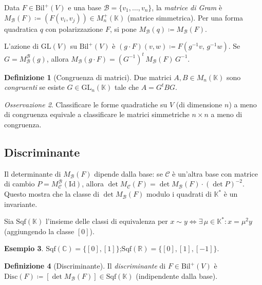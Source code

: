 \documentclass[11pt, a4paper]{book}
\theoremstyle{definition}
\newtheorem{definizione}{Definizione}[section]
\newtheorem{esempio}[definizione]{Esempio}
\theoremstyle{plain}
\theoremstyle{remark}
\newtheorem{osservazione}[definizione]{Osservazione}
\newcommand{\R}{\mathbb{R}}
\newcommand{\C}{\mathbb{C}}
\newcommand{\K}{\mathbb{K}}
\newcommand{\Id}{\mathrm{Id}}
\newcommand{\GL}{\mathrm{GL}}
\begin{document}
Data $F \in \mathrm{Bil}^+(V)$ e una base $\mathcal{B} = \{v_1,\ldots,v_n\}$, la \emph{matrice di Gram} è $M_\mathcal{B}(F) \coloneqq (F(v_i,v_j)) \in M_n^+(\K)$ (matrice simmetrica). Per una forma quadratica $q$ con polarizzazione $F$, si pone $M_\mathcal{B}(q) \coloneqq M_\mathcal{B}(F)$.

L'azione di $\GL(V)$ su $\mathrm{Bil}^+(V)$ è $(g \cdot F)(v,w) \coloneqq F(g^{-1}v,\,g^{-1}w)$. Se $G = M^\mathcal{B}_\mathcal{B}(g)$, allora $M_\mathcal{B}(g\cdot F) = (G^{-1})^t\,M_\mathcal{B}(F)\,G^{-1}$.

\begin{defbox}
\begin{definizione}[Congruenza di matrici]
\label{def:matrici-congruenti}
Due matrici $A, B \in M_n(\K)$ sono \emph{congruenti} se esiste $G \in \GL_n(\K)$ tale che $A = G^t B G$.
\end{definizione}
\end{defbox}

\begin{osservazione}
Classificare le forme quadratiche su $V$ (di dimensione $n$) a meno di congruenza equivale a classificare le matrici simmetriche $n \times n$ a meno di congruenza.
\end{osservazione}

\subsection{Discriminante}

Il determinante di $M_\mathcal{B}(F)$ dipende dalla base: se $\mathcal{C}$ è un'altra base con matrice di cambio $P = M^\mathcal{B}_\mathcal{C}(\Id)$, allora $\det M_\mathcal{C}(F) = \det M_\mathcal{B}(F) \cdot (\det P)^{-2}$. Questo mostra che la classe di $\det M_\mathcal{B}(F)$ modulo i quadrati di $\K^*$ è un invariante.

Sia $\mathrm{Sqf}(\K)$ l'insieme delle classi di equivalenza per $x \sim y \Leftrightarrow \exists\,\mu \in \K^*: x = \mu^2 y$ (aggiungendo la classe $[0]$).

\begin{exbox}
\begin{esempio}
$\mathrm{Sqf}(\C) = \{[0],[1]\}$;\quad $\mathrm{Sqf}(\R) = \{[0],[1],[-1]\}$.
\end{esempio}
\end{exbox}

\begin{defbox}
\begin{definizione}[Discriminante]
Il \emph{discriminante} di $F \in \mathrm{Bil}^+(V)$ è $\mathrm{Disc}(F) \coloneqq [\det M_\mathcal{B}(F)] \in \mathrm{Sqf}(\K)$ (indipendente dalla base).
\end{definizione}
\end{defbox}
\end{document}
